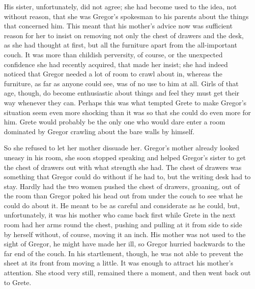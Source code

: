 His sister, unfortunately, did not agree; she had become used to the
idea, not without reason, that she was Gregor’s spokesman to his
parents about the things that concerned him. This meant that his
mother’s advice now was sufficient reason for her to insist on removing
not only the chest of drawers and the desk, as she had thought at
first, but all the furniture apart from the all-important couch. It was
more than childish perversity, of course, or the unexpected confidence
she had recently acquired, that made her insist; she had indeed noticed
that Gregor needed a lot of room to crawl about in, whereas the
furniture, as far as anyone could see, was of no use to him at all.
Girls of that age, though, do become enthusiastic about things and feel
they must get their way whenever they can. Perhaps this was what
tempted Grete to make Gregor’s situation seem even more shocking than
it was so that she could do even more for him. Grete would probably be
the only one who would dare enter a room dominated by Gregor crawling
about the bare walls by himself.

So she refused to let her mother dissuade her. Gregor’s mother already
looked uneasy in his room, she soon stopped speaking and helped
Gregor’s sister to get the chest of drawers out with what strength she
had. The chest of drawers was something that Gregor could do without if
he had to, but the writing desk had to stay. Hardly had the two women
pushed the chest of drawers, groaning, out of the room than Gregor
poked his head out from under the couch to see what he could do about
it. He meant to be as careful and considerate as he could, but,
unfortunately, it was his mother who came back first while Grete in the
next room had her arms round the chest, pushing and pulling at it from
side to side by herself without, of course, moving it an inch. His
mother was not used to the sight of Gregor, he might have made her ill,
so Gregor hurried backwards to the far end of the couch. In his
startlement, though, he was not able to prevent the sheet at its front
from moving a little. It was enough to attract his mother’s attention.
She stood very still, remained there a moment, and then went back out
to Grete.

